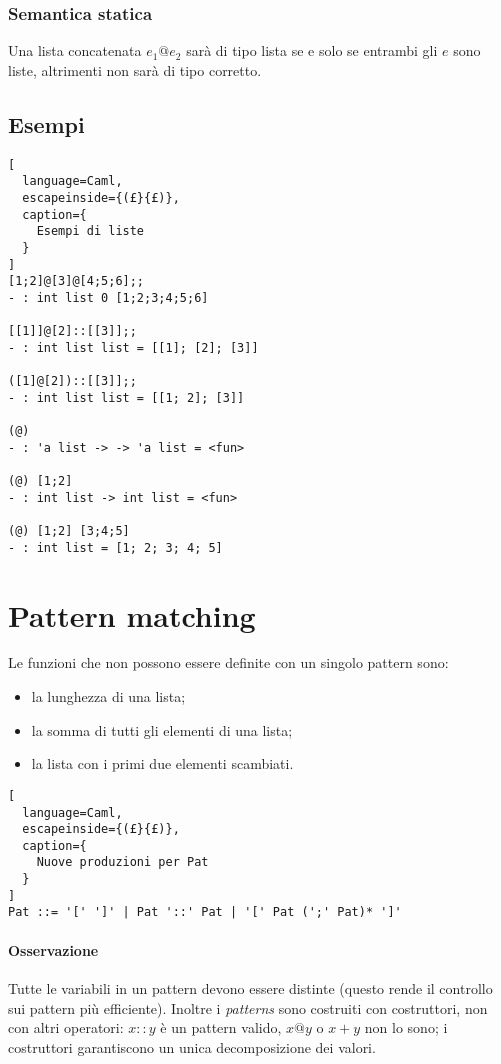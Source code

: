 \subsubsection{Semantica statica}
Una lista concatenata $e_1@e_2$ sarà di tipo lista se e solo se entrambi gli
$e$ sono liste, altrimenti non sarà di tipo corretto.

\subsection{Esempi}
\begin{lstlisting}[
  language=Caml,
  escapeinside={(£}{£)},
  caption={
    Esempi di liste
  }
]
[1;2]@[3]@[4;5;6];;
- : int list 0 [1;2;3;4;5;6]

[[1]]@[2]::[[3]];;
- : int list list = [[1]; [2]; [3]]

([1]@[2])::[[3]];;
- : int list list = [[1; 2]; [3]] 

(@)
- : 'a list -> -> 'a list = <fun>

(@) [1;2]
- : int list -> int list = <fun>

(@) [1;2] [3;4;5]
- : int list = [1; 2; 3; 4; 5]
\end{lstlisting}

\section{Pattern matching}
Le funzioni che non possono essere definite con un singolo pattern sono:
\begin{itemize}
  \item la lunghezza di una lista;
  \item la somma di tutti gli elementi di una lista;
  \item la lista con i primi due elementi scambiati.
\end{itemize}

\begin{lstlisting}[
  language=Caml,
  escapeinside={(£}{£)},
  caption={
    Nuove produzioni per Pat
  }
]
Pat ::= '[' ']' | Pat '::' Pat | '[' Pat (';' Pat)* ']'
\end{lstlisting}

\paragraph{Osservazione}
Tutte le variabili in un pattern devono essere distinte (questo
rende il controllo sui pattern più efficiente).
Inoltre i \emph{patterns} sono costruiti con costruttori, non con
altri operatori:
$x::y$ è un pattern valido, $x@y$ o $x+y$ non lo sono; i costruttori
garantiscono un unica decomposizione dei valori.

